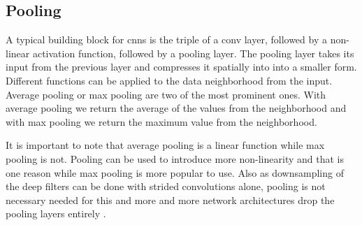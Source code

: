 \subsection{Pooling}
\label{sub:concepts:nn:pooling}
A typical building block for \glspl{cnn} is the triple of a \gls{conv} layer, followed by a non-linear activation function, followed by a pooling layer. The pooling layer takes its input from the previous layer and compresses it spatially into into a smaller form. Different functions can be applied to the data neighborhood from the input. Average pooling \citep{lecun_handwritten_1990} or max pooling \citep{zhou_computation_1988} are two of the most prominent ones. With average pooling we return the average of the values from the neighborhood and with max pooling we return the maximum value from the neighborhood.

It is important to note that average pooling is a linear function while max pooling is not. Pooling can be used to introduce more non-linearity and that is one reason while max pooling is more popular to use. Also as downsampling of the deep filters can be done with strided convolutions alone, pooling is not necessary needed for this and more and more network architectures drop the pooling layers entirely \citep{springenberg_striving_2014}.

